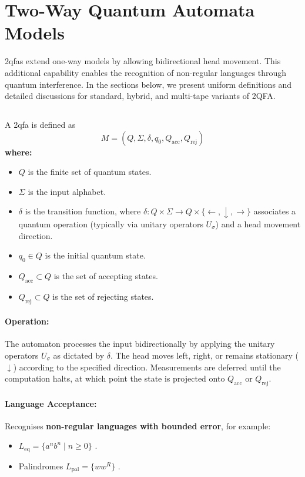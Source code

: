 \section{Two-Way Quantum Automata Models}
\label{sec:two-way-qfas}
\glspl{2qfa} extend one-way models by allowing bidirectional head movement. This additional capability enables the recognition of non-regular languages through quantum interference. In the sections below, we present uniform definitions and detailed discussions for standard, hybrid, and multi-tape variants of 2QFA.

\subsection{}
\label{subsec:2qfa}
\begin{definition}
A \gls{2qfa} is defined as 
\[
M = (Q, \Sigma, \delta, q_0, Q_{\text{acc}}, Q_{\text{rej}})
\]
\textbf{where:}
\begin{itemize}
    \item \( Q \) is the finite set of quantum states.
    \item \( \Sigma \) is the input alphabet.
    \item \( \delta \) is the transition function, where \(\delta: Q \times \Sigma \to Q \times \{\leftarrow, \downarrow, \rightarrow\}\) associates a quantum operation (typically via unitary operators \( U_\sigma \)) and a head movement direction.
    \item \( q_0 \in Q \) is the initial quantum state.
    \item \( Q_{\text{acc}} \subset Q \) is the set of accepting states.
    \item \( Q_{\text{rej}} \subset Q \) is the set of rejecting states.
\end{itemize}
\end{definition}

\paragraph{Operation:}  
The automaton processes the input bidirectionally by applying the unitary operators \( U_\sigma \) as dictated by \( \delta \). The head moves left, right, or remains stationary (\(\downarrow\)) according to the specified direction. Measurements are deferred until the computation halts, at which point the state is projected onto \( Q_{\text{acc}} \) or \( Q_{\text{rej}} \).

\paragraph{Language Acceptance:}  
Recognises \textbf{non-regular languages with bounded error}, for example:
\begin{itemize}
    \item \( L_{\text{eq}} = \{a^n b^n \mid n \geq 0\} \) \cite{kondacs1997power}.
    \item Palindromes \( L_{\text{pal}} = \{ww^R\} \) \cite{yakaryilmaz2010succinctness}.
\end{itemize}


